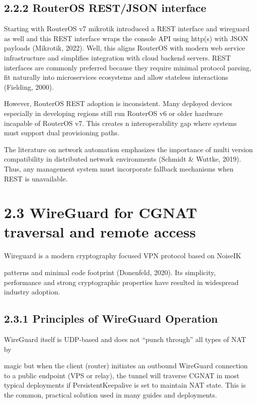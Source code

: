 \documentclass[12pt,a4paper,oneside]{report}
\begin{document}
\subsection{2.2.2 RouterOS REST/JSON interface}

Starting with RouterOS v7 mikrotik introduced a REST interface and wireguard as well and this REST interface wraps the console API using http(s) with JSON payloads (Mikrotik, 2022). Well, this aligns RouterOS with modern web service infrastructure and simplifies integration with cloud backend servers. REST interfaces are commonly preferred because they require minimal protocol parsing, fit naturally into microservices ecosystems and allow stateless interactions (Fielding, 2000).


However, RouterOS REST adoption is inconsistent. Many deployed devices especially in developing regions still run RouterOS v6 or older hardware incapable of RouterOS v7. This creates n interoperability gap where systems must support dual provisioning paths.


The literature on network automation emphasizes the importance of multi version compatibility in distributed network environments (Schmidt \& Wuttke, 2019). Thus, any management system must incorporate fallback mechanisms when REST is unavailable.




\section{2.3 WireGuard for CGNAT traversal and remote access }

Wireguard is a modern cryptography focused VPN protocol based on NoiseIK


patterns and minimal code footprint (Donenfeld, 2020). Its simplicity, performance and strong cryptographic properties have resulted in widespread industry adoption.




\subsection{2.3.1 Principles of WireGuard Operation}

WireGuard itself is UDP-based and does not ``punch through'' all types of NAT by


magic but when the client (router) initiates an outbound WireGuard connection to a public endpoint (VPS or relay), the tunnel will traverse CGNAT in most typical deployments if PersistentKeepalive is set to maintain NAT state. This is the common, practical solution used in many guides and deployments.
\end{document}
